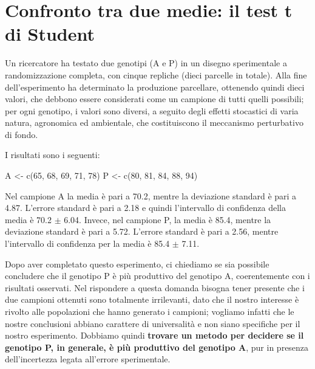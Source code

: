 \documentclass[a4paper,12pt,oneside]{book}
\newenvironment{Shaded}{\begin{snugshade}}{\end{snugshade}}
\newcommand{\DecValTok}[1]{#1}
\newcommand{\OtherTok}[1]{#1}
\newcommand{\FunctionTok}[1]{#1}
\newcommand{\NormalTok}[1]{#1}
\begin{document}
\hypertarget{confronto-tra-due-medie-il-test-t-di-student}{%
\section{Confronto tra due medie: il test t di Student}\label{confronto-tra-due-medie-il-test-t-di-student}}

Un ricercatore ha testato due genotipi (A e P) in un disegno sperimentale a randomizzazione completa, con cinque repliche (dieci parcelle in totale). Alla fine dell'esperimento ha determinato la produzione parcellare, ottenendo quindi dieci valori, che debbono essere considerati come un campione di tutti quelli possibili; per ogni genotipo, i valori sono diversi, a seguito degli effetti stocastici di varia natura, agronomica ed ambientale, che costituiscono il meccanismo perturbativo di fondo.

I risultati sono i seguenti:

\begin{Shaded}
\begin{Highlighting}[]
\NormalTok{A }\OtherTok{\textless{}{-}} \FunctionTok{c}\NormalTok{(}\DecValTok{65}\NormalTok{, }\DecValTok{68}\NormalTok{, }\DecValTok{69}\NormalTok{, }\DecValTok{71}\NormalTok{, }\DecValTok{78}\NormalTok{)}
\NormalTok{P }\OtherTok{\textless{}{-}} \FunctionTok{c}\NormalTok{(}\DecValTok{80}\NormalTok{, }\DecValTok{81}\NormalTok{, }\DecValTok{84}\NormalTok{, }\DecValTok{88}\NormalTok{, }\DecValTok{94}\NormalTok{)}
\end{Highlighting}
\end{Shaded}

Nel campione A la media è pari a 70.2, mentre la deviazione standard è pari a 4.87. L'errore standard è pari a 2.18 e quindi l'intervallo di confidenza della media è 70.2 \(\pm\) 6.04. Invece, nel campione P, la media è 85.4, mentre la deviazione standard è pari a 5.72. L'errore standard è pari a 2.56, mentre l'intervallo di confidenza per la media è 85.4 \(\pm\) 7.11.

Dopo aver completato questo esperimento, ci chiediamo se sia possibile concludere che il genotipo P è più produttivo del genotipo A, coerentemente con i risultati osservati. Nel rispondere a questa domanda bisogna tener presente che i due campioni ottenuti sono totalmente irrilevanti, dato che il nostro interesse è rivolto alle popolazioni che hanno generato i campioni; vogliamo infatti che le nostre conclusioni abbiano carattere di universalità e non siano specifiche per il nostro esperimento. Dobbiamo quindi \textbf{trovare un metodo per decidere se il genotipo P, in generale, è più produttivo del genotipo A}, pur in presenza dell'incertezza legata all'errore sperimentale.
\end{document}
